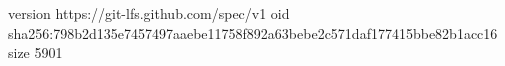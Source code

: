 version https://git-lfs.github.com/spec/v1
oid sha256:798b2d135e7457497aaebe11758f892a63bebe2c571daf177415bbe82b1acc16
size 5901
